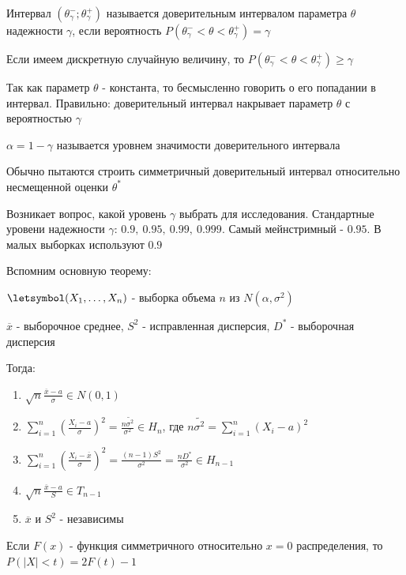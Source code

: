 \Def Интервал $(\theta^-_\gamma; \theta^+_\gamma)$ называется доверительным интервалом параметра $\theta$
надежности $\gamma$, если вероятность $P(\theta^-_\gamma < \theta < \theta^+_\gamma) = \gamma$

\Nota Если имеем дискретную случайную величину, то $P(\theta^-_\gamma < \theta < \theta^+_\gamma) \geq \gamma$

\Notas Так как параметр $\theta$ - константа, то бесмысленно говорить о его попадании в интервал. Правильно: 
доверительный интервал накрывает параметр $\theta$ с вероятностью $\gamma$

 $\alpha = 1 - \gamma$ называется уровнем значимости доверительного интервала

 Обычно пытаются строить симметричный доверительный интервал относительно несмещенной оценки $\theta^*$

 Возникает вопрос, какой уровень $\gamma$ выбрать для исследования.
Стандартные уровени надежности $\gamma$: $0.9, \ 0.95, \ 0.99, \ 0.999$. Самый мейнстримный - $0.95$. 
В малых выборках используют $0.9$

Вспомним основную теорему:

\begin{MyTheorem}
    $\letsymbol (X_1, \dots, X_n)$ - выборка объема $n$ из $N(\alpha, \sigma^2)$

    $\overline{x}$ - выборочное среднее, $S^2$ - исправленная дисперсия, $D^*$ - выборочная дисперсия

    Тогда:

    \begin{enumerate}
        \item $\sqrt{n} \frac{\overline{x} - a}{\sigma} \in N(0, 1)$
        \item $\sum_{i = 1}^n \left(\frac{X_i - a}{\sigma}\right)^2 = \frac{n \tilde{\sigma^2}}{\sigma^2} \in H_n$, 
        где $n \tilde{\sigma^2} = \sum_{i = 1}^n (X_i - a)^2$
        \item $\sum_{i = 1}^n \left(\frac{X_i - \overline{x}}{\sigma}\right)^2 = \frac{(n - 1)S^2}{\sigma^2} = 
        \frac{nD^*}{\sigma^2} \in H_{n - 1}$
        \item $\sqrt{n} \frac{\overline{x} - a}{S} \in T_{n - 1}$
        \item $\overline{x}$ и $S^2$ - независимы
    \end{enumerate}
\end{MyTheorem}


\Nota Если $F(x)$ - функция симметричного относительно $x = 0$ распределения, то $P(|X| < t) = 2F(t) - 1$

